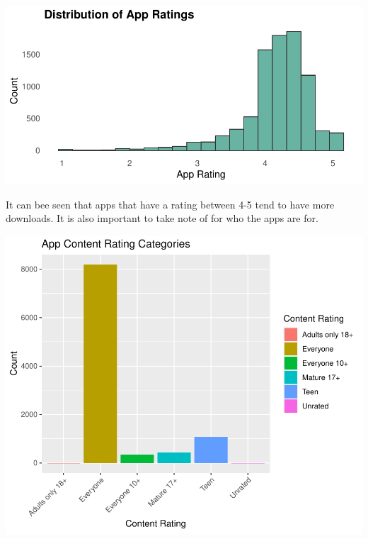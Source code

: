 \documentclass[11pt,preprint, authoryear]{elsarticle}
\let\origfigure\figure
\let\endorigfigure\endfigure
\renewenvironment{figure}[1][2] {
    \expandafter\origfigure\expandafter[H]
} {
    \endorigfigure
}
\numberwithin{equation}{section}
\numberwithin{figure}{section}
\numberwithin{table}{section}
\begin{document}
\begin{figure}[H]

{\centering \includegraphics{Q5_files/figure-latex/Figure1-1} 

}

\caption{APP ratings  \label{Figure1}}\label{fig:Figure1}
\end{figure}

It can bee seen that apps that have a rating between 4-5 tend to have
more downloads. It is also important to take note of for who the apps
are for.

\begin{figure}[H]

{\centering \includegraphics{Q5_files/figure-latex/Figure2-1} 

}

\caption{CONTENT   \label{Figure2}}\label{fig:Figure2}
\end{figure}
\end{document}
